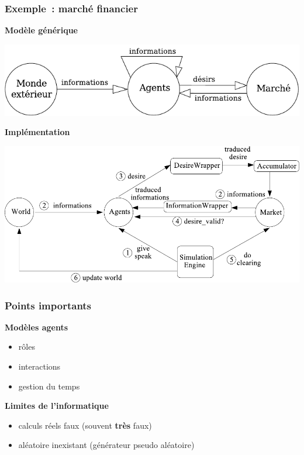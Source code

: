 \documentclass{beamer}
\begin{document}
\begin{frame}
  \frametitle{Exemple~: marché financier}

  \null\vfill

  \textbf{Modèle générique}

  \begin{center}
    \includegraphics[width=.8\columnwidth]{marche.pdf}
  \end{center}

  \textbf{Implémentation}
  
  \begin{center}
    \includegraphics[width=.8\columnwidth]{modele.pdf}
  \end{center}
\end{frame}


\begin{frame}
  \frametitle{Points importants}

  \textbf{Modèles agents}

  \begin{itemize}
  \item rôles
  \item interactions
  \item gestion du temps
  \end{itemize}

  \vfill

  \textbf{Limites de l'informatique}

  \begin{itemize}
  \item calculs réels faux (souvent \textbf{très} faux)
  \item aléatoire inexistant (générateur pseudo aléatoire)
  \end{itemize}
\end{frame}
\end{document}
